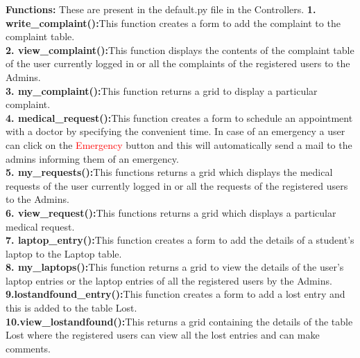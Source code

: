 \documentclass[a4paper,11pt]{article}
\begin{document}
{\Large{\bfseries Functions:}
	\newline
	\newline
These are present in the default.py file in the Controllers.}
\newline
\newline
{\bfseries 1. write\_complaint():}This function creates a form to add the complaint to the complaint table.
\newline
\\
{\bfseries 2. view\_complaint():}This function displays the contents of the complaint table of the user currently logged in or all the complaints of the registered users to the Admins.
\newline
\\
{\bfseries 3. my\_complaint():}This function returns a grid to display a particular complaint.
\newline
\\
{\bfseries 4. medical\_request():}This function creates a form to schedule an appointment with a doctor by specifying the convenient time.
\newline
In case of an emergency a user can click on the \textcolor{red}{Emergency} button and this will automatically send a mail to the admins informing them of an emergency.
\newline
\\
{\bfseries 5. my\_requests():}This functions returns a grid which displays the medical requests of the user currently logged in or all the requests of the registered users to the Admins.
\newline
\\
{\bfseries 6. view\_request():}This functions returns a grid which displays a particular medical request.
\newline
\\
{\bfseries 7. laptop\_entry():}This function creates a form to add the details of a student's laptop to the Laptop table.
\newline
\\
{\bfseries 8. my\_laptops():}This function returns a grid to view the details of the user's laptop entries or the laptop entries of all the registered users by the Admins.
\newline
\\
{\bfseries 9.lostandfound\_entry():}This function creates a form to add a lost entry and this is added to the table Lost.
\newline
\\
{\bfseries 10.view\_lostandfound():}This returns a grid containing the details of the table Lost where the registered users can view all the lost entries and can make comments.
\end{document}

